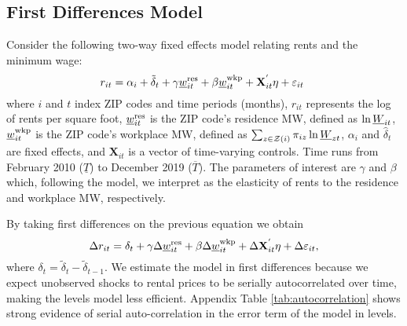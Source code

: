     
\subsection{First Differences Model}

Consider the following two-way fixed effects model relating rents and the 
minimum wage:
\begin{equation*} \label{eq:did_lev}
    r_{it} = \alpha_i + \tilde{\delta}_t 
           + \gamma \underline{w}^{\text{res}}_{it} + \beta \underline{w}^{\text{wkp}}_{it}
           + \mathbf{X}^{'}_{it}\eta
           + \varepsilon_{it} \ 
\end{equation*}    
where
$i$ and $t$ index ZIP codes and time periods (months),
$r_{it}$ represents the log of rents per square foot,
$\underline{w}^{\text{res}}_{it}$ is the ZIP code's residence MW, defined as 
$\ln \underline{W}_{it}$,
$\underline{w}^{\text{wkp}}_{it}$ is the ZIP code's workplace MW, defined as 
$\sum_{z\in\mathcal{Z}(i)} \pi_{iz}\ln \underline{W}_{zt}$,
$\alpha_i$ and $\hat{\delta}_t$ are fixed effects, and 
$\mathbf{X}_{it}$ is a vector of time-varying controls.
Time runs from February 2010 ($\underline{T}$) to December 2019 ($\overline{T}$).
The parameters of interest are $\gamma$ and $\beta$ which, following the model, 
we interpret as the elasticity of rents to the residence and workplace MW, 
respectively.

By taking first differences on the previous equation we obtain
\begin{equation}\label{eq:fd}
    \Delta r_{it} = \delta_t
                  + \gamma \Delta \underline{w}^{\text{res}}_{it} + \beta \Delta \underline{w}^{\text{wkp}}_{it}
                  + \Delta \mathbf{X}^{'}_{it}\eta
                  + \Delta \varepsilon_{it} ,
\end{equation}
where $\delta_t = \tilde{\delta}_t - \tilde{\delta}_{t-1}$.
We estimate the model in first differences because we expect unobserved shocks
to rental prices to be serially autocorrelated over time, making the levels
model less efficient.
Appendix Table \ref{tab:autocorrelation} shows strong evidence of serial 
auto-correlation in the error term of the model in levels.

